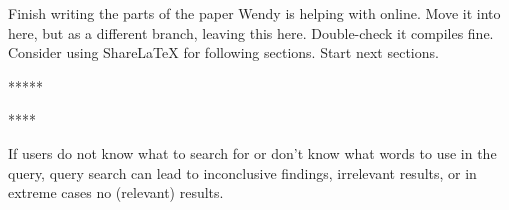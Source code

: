 Finish writing the parts of the paper Wendy is helping with online.
Move it into here, but as a different branch, leaving this here.
Double-check it compiles fine.
Consider using ShareLaTeX for following sections.
Start next sections.





*****



****

If users do not know what to search for or don't know what words to use in the query, query search can lead to inconclusive findings, irrelevant results, or in extreme cases no (relevant) results.




